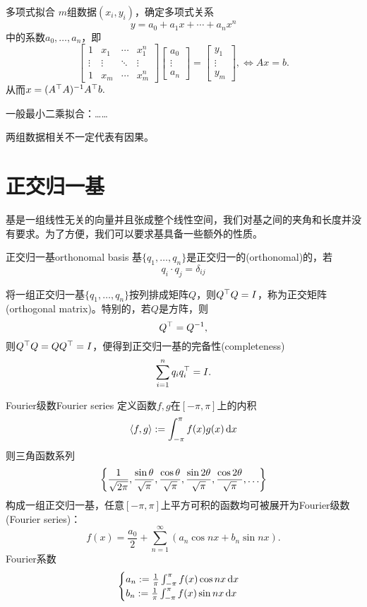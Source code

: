 \begin{method}{多项式拟合}{}
	$m$组数据$(x_i,y_i)$，确定多项式关系
	\[
		y=a_0+a_1x+\cdots+a_nx^n
	\]
	中的系数$a_0,\ldots,a_n$，即 
	\[
		\begin{bmatrix}
			1&x_1&\cdots&x_1^n\\\vdots&\vdots&\ddots&\vdots\\1&x_m&\cdots&x_m^n
		\end{bmatrix}
		\begin{bmatrix}
			a_0\\\vdots\\a_n
		\end{bmatrix}=
		\begin{bmatrix}
			y_1\\\vdots\\y_m
		\end{bmatrix},\iff Ax=b.
	\]
	从而$x=(A^\top A)^{-1} A^\top b.$
\end{method}
一般最小二乘拟合：……

两组数据相关不一定代表有因果。

\section{正交归一基}

基是一组线性无关的向量并且张成整个线性空间，我们对基之间的夹角和长度并没有要求。为了方便，我们可以要求基具备一些额外的性质。
\begin{definition}{正交归一基}{orthonomal basis}
	基$\{q_1,\ldots,q_n\}$是正交归一的(orthonomal)的，若 
	\[
		q_i\cdot q_j=\delta_{ij}
	\]
\end{definition}
将一组正交归一基$\{q_1,\ldots,q_n\}$按列排成矩阵$Q$，则$Q^\top Q=I$，称为正交矩阵(orthogonal matrix)。特别的，若$Q$是方阵，则
\[
	Q^\top=Q^{-1},
\]
则$Q^\top Q=QQ^\top=I$，便得到正交归一基的完备性(completeness)
\[
	\sum_{i=1}^nq_iq_i^\top=I.
\]
\begin{example}{Fourier级数}{Fourier series}
	定义函数$f,g$在$[-\pi,\pi]$上的内积
	\[
		\left\langle f,g\right\rangle:=\int_{-\pi}^\pi f(x)g(x)\mathop{}\!\mathrm{d} x
	\]
	则三角函数系列
	\[
		\left\{\frac1{\sqrt{2\pi}},\frac{\sin\theta}{\sqrt\pi},\frac{\cos\theta}{\sqrt\pi},\frac{\sin2\theta}{\sqrt\pi},\frac{\cos2\theta}{\sqrt\pi},\ldots\right\}
	\]
	构成一组正交归一基，任意$[-\pi,\pi]$上平方可积的函数均可被展开为Fourier级数(Fourier series)：
	\[
		f(x)=\frac{a_0}2+\sum_{n=1}^\infty(a_n\cos nx+b_n\sin nx).
	\]
	Fourier系数
	\[
		\begin{cases}
			a_n:=\frac1\pi\int_{-\pi}^\pi f(x)\cos nx\mathop{}\!\mathrm{d} x\\
			b_n:=\frac1\pi\int_{-\pi}^\pi f(x)\sin nx\mathop{}\!\mathrm{d} x
		\end{cases}
	\]
\end{example}

